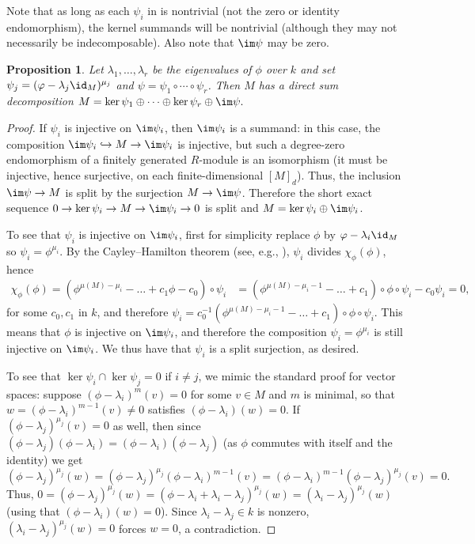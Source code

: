 \documentclass[12pt]{article}
\theoremstyle{theorem}
\numberwithin{thm}{section}
\newtheorem{prop}[thm]{Proposition}
\theoremstyle{definition}
\begin{document}
Note that as long as each $\psi_i$ in  is nontrivial (not the zero or identity endomorphism), the kernel summands will be nontrivial (although they may not necessarily be indecomposable). Also note that $\im\psi$ may be zero.

\begin{prop}\label{prop:split-surj}
  Let $\lambda_1,\dots,\lambda_r$ be the eigenvalues of $\phi$ over $k$ and set $\psi_j = (\phi - \lambda_j\id_M)^{\mu_j}$ and $\psi = \psi_1\circ\cdots\circ\psi_r$. Then $M$ has a direct sum decomposition
  \( M = \ker\psi_1 \oplus \cdots \oplus \ker\psi_r \oplus \im\psi. \)
\end{prop}
\begin{proof}
  If $\psi_i$ is injective on $\im\psi_i$, then $\im\psi_i$ is a summand: in this case, the composition $\im\psi_i\hookrightarrow M\to \im\psi_i$ is injective, but such a degree-zero endomorphism of a finitely generated $R$-module is an isomorphism (it must be injective, hence surjective, on each finite-dimensional $[M]_d$). Thus, the inclusion $\im \psi \to M$ is split by the surjection $M\to \im \psi$. Therefore the short exact sequence $0\to\ker\psi_i\to M\to\im\psi_i\to 0$ is split and $M = \ker\psi_i\oplus\im\psi_i$.

  To see that $\psi_i$ is injective on $\im\psi_i$, first for simplicity replace $\phi$ by $\phi-\lambda_i\id_M$ so $\psi_i = \phi^{\mu_i}$. By the Cayley--Hamilton theorem (see, e.g., \cite[Theorem~4.3]{Eisenbud95}), $\psi_i$ divides $\chi_\phi(\phi)$, hence
  \begin{align*}
    \chi_\phi(\phi) = \left(\phi^{\mu(M) - \mu_i} - \dots + c_1\phi - c_0\right) \circ \psi_i
    &= \left(\phi^{\mu(M) - \mu_i - 1} - \dots + c_1\right) \circ \phi \circ \psi_i - c_0 \psi_i = 0,
  \end{align*}
  for some $c_0,c_1$ in $k$, and therefore
  \( \psi_i = c_0^{-1} \left(\phi^{\mu(M) - \mu_i - 1} - \dots + c_1\right) \circ \phi \circ \psi_i. \)
  This means that $\phi$ is injective on $\im\psi_i$, and therefore the composition $\psi_i=\phi^{\mu_i}$ is still injective on $\im\psi_i$.
We thus have that $\psi_i$ is a split surjection, as desired.

  To see that $\ker\psi_i\cap\ker\psi_j = 0$ if $i\neq j$, we mimic the standard proof for vector spaces: suppose $(\phi - \lambda_i)^m(v) = 0$ for some $v\in M$ and $m$ is minimal, so that $w = (\phi-\lambda_i)^{m-1}(v) \neq 0$ satisfies $(\phi-\lambda_i)(w) = 0$. 
If $(\phi - \lambda_j)^{\mu_j}(v) = 0$ as well, then since $(\phi - \lambda_j)(\phi - \lambda_i) = (\phi - \lambda_i)(\phi - \lambda_j)$ (as $\phi$ commutes with itself and the identity) we get
  \[
  (\phi - \lambda_j)^{\mu_j}(w)
  = (\phi - \lambda_j)^{\mu_j}(\phi - \lambda_i)^{m-1}(v)
  = (\phi - \lambda_i)^{m-1}(\phi - \lambda_j)^{\mu_j}(v) = 0.
  \]
Thus,
  \(
  0 = (\phi - \lambda_j)^{\mu_j}(w) = (\phi - \lambda_i + \lambda_i - \lambda_j)^{\mu_j}(w) = (\lambda_i - \lambda_j)^{\mu_j}(w)
  \)
(using that $(\phi - \lambda_i)(w)=0$).
Since $\lambda_i-\lambda_j \in k$ is nonzero, 
$(\lambda_i - \lambda_j)^{\mu_j}(w)= 0 $ forces $w=0$, a contradiction.


\end{proof}
\end{document}
